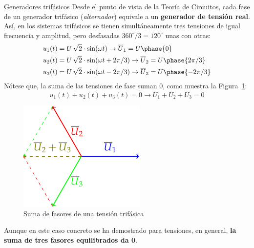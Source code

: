 \documentclass[11pt]{book} %
\makeatletter
\numberwithin{dummy}{section}
\theoremstyle{ocrenumbox}
\theoremstyle{blacknumex}
\theoremstyle{blacknumbox}
\theoremstyle{ocrenum}
\newenvironment{remark}{\par\vspace{10pt}\small %
\begin{list}{}{
\leftmargin=35pt %
\rightmargin=25pt}\item\ignorespaces %
\makebox[-2.5pt]{\begin{tikzpicture}[overlay]
\node[draw=ocre!60,line width=1pt,circle,fill=ocre!25,font=\sffamily\bfseries,inner sep=2pt,outer sep=0pt] at (-15pt,0pt){\textcolor{ocre}{N}};\end{tikzpicture}} %
\advance\baselineskip -1pt}{\end{list}\vskip5pt} %
\renewcommand{\section}{\@startsection{section}{1}{\z@}
{-4ex \@plus -1ex \@minus -.4ex}
{1ex \@plus.2ex }
{\normalfont\large\sffamily\bfseries}}
\newlength\esp
\makeatother
\begin{document}
	\section{Generadores trifásicos}
	Desde el punto de vista de la Teoría de Circuitos, cada fase de un generador trifásico (\textit{alternador}) equivale a un \textbf{generador de tensión real}. Así, en los sistemas trifásicos se tienen simultáneamente tres tensiones de igual frecuencia y amplitud, pero desfasadas $360^\circ/3=120^\circ$ unas con otras:
	\begin{align*}
		u_1(t) &= U\,\sqrt{2}\cdot \sin(\omega t)\rightarrow  \overline{U}_1 = U\phase{0}\\
		u_2(t) &= U\,\sqrt{2} \cdot\sin(\omega t + 2\pi/3) \rightarrow  \overline{U}_2 = U\phase{2\pi/3}\\
		u_3(t) &= U\,\sqrt{2}\cdot \sin(\omega t - 2\pi/3) \rightarrow  \overline{U}_3 = U\phase{-2\pi/3}
	\end{align*}
	Nótese que, la suma de las tensiones de fase suman 0, como muestra la Figura~\ref{fig.fasoressumacero}:
	\begin{equation*}
		u_1(t) + u_2(t) + u_3(t) = 0\rightarrow \overline{U}_1 + \overline{U}_2 + \overline{U}_3 = 0
	\end{equation*}
	\begin{figure}
		\centering
		\includegraphics{../figs/FasoresSumaCero.pdf}
		\caption{Suma de fasores de una tensión trifásica}
		\label{fig.fasoressumacero}
	\end{figure}
	\begin{remark}
	    Aunque en este caso concreto se ha demostrado para tensiones, en general, \textbf{la suma de tres fasores equilibrados da 0}.
	\end{remark}
	
\end{document}
